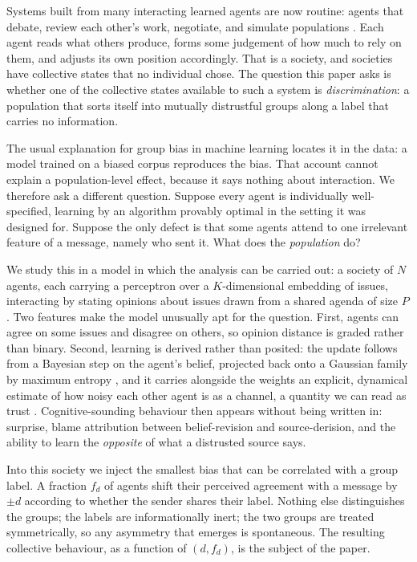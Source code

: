 \documentclass{article}
\newcommand{\fd}{f_{d}}
\begin{document}
Systems built from many interacting learned agents are now routine: agents that
debate, review each other's work, negotiate, and simulate populations
\citep{park2023generative,du2023debate,chuang2024simulating}. Each agent reads
what others produce, forms some judgement of how much to rely on them, and adjusts
its own position accordingly. That is a society, and societies have collective
states that no individual chose. The question this paper asks is whether one of the
collective states available to such a system is \emph{discrimination}: a
population that sorts itself into mutually distrustful groups along a label that
carries no information.

The usual explanation for group bias in machine learning locates it in the data:
a model trained on a biased corpus reproduces the bias. That account cannot
explain a population-level effect, because it says nothing about interaction. We
therefore ask a different question. Suppose every agent is individually well-specified,
learning by an algorithm provably optimal in the setting it was designed for. Suppose
the only defect is that some agents
attend to one irrelevant feature of a message, namely who sent it. What does the
\emph{population} do?

We study this in a model in which the analysis can be carried out: a society of
$N$ agents, each carrying a perceptron over a $K$-dimensional embedding of
issues, interacting by stating opinions about issues drawn from a shared agenda
of size $P$. Two features make the model unusually apt for the question. First,
agents can agree on some issues and disagree on others, so opinion distance
is graded rather than binary. Second, learning is derived rather than posited:
the update follows from a Bayesian step on the agent's belief, projected back
onto a Gaussian family by maximum entropy
\citep{opper1996online,opper1998bayesian,caticha2020entropic}, and it carries
alongside the weights an explicit, dynamical estimate of how noisy each other
agent is as a channel, a quantity we can read as trust
\citep{alves2016distrust,caticha2011agent}. Cognitive-sounding behaviour then
appears without being written in: surprise, blame attribution between
belief-revision and source-derision, and the ability to learn the \emph{opposite}
of what a distrusted source says.

Into this society we inject the smallest bias that can be correlated with a group
label. A fraction $\fd$ of agents shift their perceived agreement with a message
by $\pm d$ according to whether the sender shares their label. Nothing else
distinguishes the groups; the labels are informationally inert; the two groups are
treated symmetrically, so any asymmetry that emerges is spontaneous. The
resulting collective behaviour, as a function of $(d,\fd)$, is the subject of the
paper.
\end{document}
